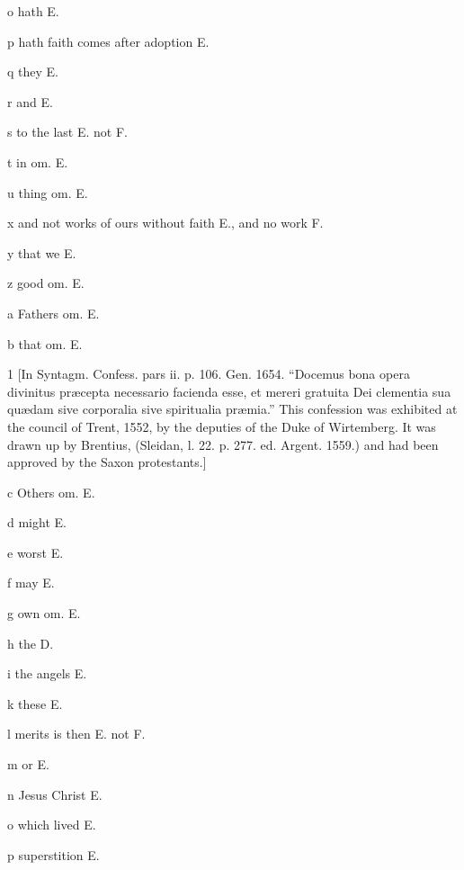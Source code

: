 o
hath E.

p
hath faith comes after adoption E.

q
they E.

r
and E.

s
to the last E. not F.

t
in om. E.

u
thing om. E.

x
and not works of ours without faith E., and no work F.

y
that we E.

z
good om. E.

a
Fathers om. E.

b
that om. E.

1
[In Syntagm. Confess. pars ii. p. 106. Gen. 1654. “Docemus bona opera divinitus præcepta necessario facienda esse, et mereri gratuita Dei clementia sua quædam sive corporalia sive spiritualia præmia.” This confession was exhibited at the council of Trent, 1552, by the deputies of the Duke of Wirtemberg. It was drawn up by Brentius, (Sleidan, l. 22. p. 277. ed. Argent. 1559.) and had been approved by the Saxon protestants.]

c
Others om. E.

d
might E.

e
worst E.

f
may E.

g
own om. E.

h
the D.

i
the angels E.

k
these E.

l
merits is then E. not F.

m
or E.

n
Jesus Christ E.

o
which lived E.

p
superstition E.

